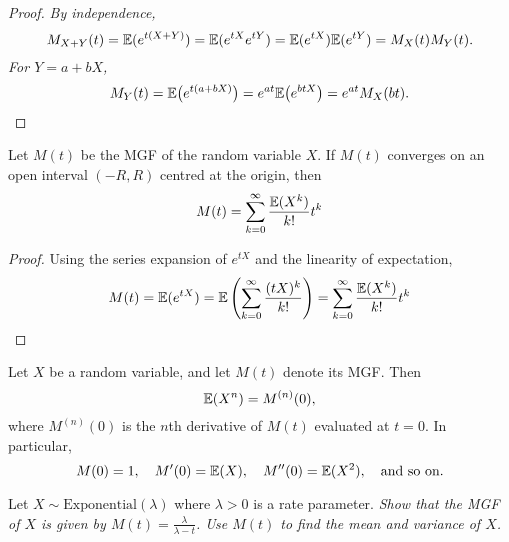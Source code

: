 \begin{proof}
\ben
\it By independence, 
\[
M_{X+Y}(t) = \mathbb{E}(e^{t(X+Y)}) = \mathbb{E}(e^{tX}e^{tY}) = \mathbb{E}(e^{tX})\mathbb{E}(e^{tY}) = M_X(t)M_Y(t).
\]
\it For $Y=a+bX$, 
\[
M_Y(t) = \mathbb{E}\big(e^{t(a+bX)}\big) = e^{at}\mathbb{E}\big(e^{btX}\big) = e^{at}M_X(bt).
\]
\een
\end{proof}

\begin{theorem}\label{taylor:mgf}
Let $M(t)$ be the MGF of the random variable $X$. If $M(t)$ converges on an open interval $(-R,R)$ centred at the origin, then 
\[
M(t) = \sum_{k=0}^{\infty} \frac{\mathbb{E}(X^k)}{k!} t^k
\]
\end{theorem}

\begin{proof}
Using the series expansion of $e^{tX}$ and the linearity of expectation,
\[
M(t) 
	= \mathbb{E}(e^{tX}) 
	= \mathbb{E}\left(\sum_{k=0}^{\infty} \frac{(tX)^k}{k!}\right)
	= \sum_{k=0}^{\infty} \frac{\mathbb{E}(X^k)}{k!} t^k
\]
\end{proof}

\begin{corollary}
Let $X$ be a random variable, and let $M(t)$ denote its MGF. Then %
\[
\mathbb{E}(X^n) = M^{(n)}(0),
\]
where $M^{(n)}(0)$ is the $n$th derivative of $M(t)$ evaluated at $t=0$. In particular,
\[
M(0) = 1,\quad M'(0) = \mathbb{E}(X),\quad M''(0) = \mathbb{E}(X^2),\quad \text{and so on.}
\]
\end{corollary}



\begin{example}
Let $X\sim\text{Exponential}(\lambda)$ where $\lambda>0$ is a rate parameter. 
\ben
\it Show that the MGF of $X$ is given by $M(t)=\displaystyle\frac{\lambda}{\lambda-t}$.
\it Use $M(t)$ to find the mean and variance of $X$.
\een
\end{example}

